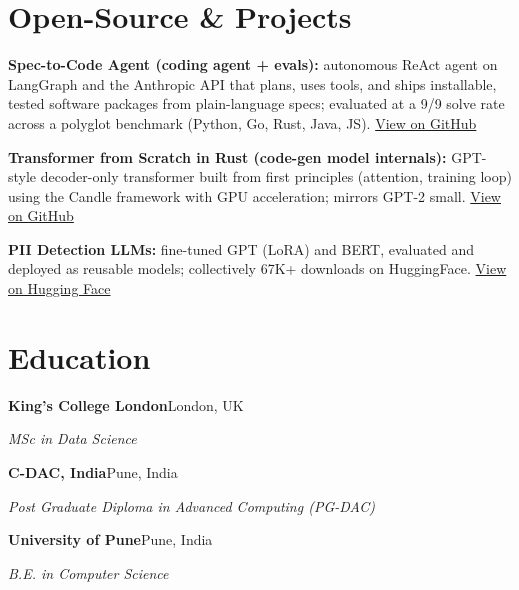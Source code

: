 \documentclass[10pt,letterpaper]{article}
\begin{document}
\section{Open-Source \& Projects}
\begin{tight}
  \item \textbf{Spec-to-Code Agent (coding agent + evals):} autonomous ReAct agent on LangGraph and the Anthropic API that plans, uses tools, and ships installable, tested software packages from plain-language specs; evaluated at a 9/9 solve rate across a polyglot benchmark (Python, Go, Rust, Java, JS). \href{https://github.com/abhijeetscode/Spec-to-Code-Agent}{View on GitHub}
  \item \textbf{Transformer from Scratch in Rust (code-gen model internals):} GPT-style decoder-only transformer built from first principles (attention, training loop) using the Candle framework with GPU acceleration; mirrors GPT-2 small. \href{https://github.com/abhijeetscode/transformer-rust}{View on GitHub}
  \item \textbf{PII Detection LLMs:} fine-tuned GPT (LoRA) and BERT, evaluated and deployed as reusable models; collectively 67K+ downloads on HuggingFace. \href{https://huggingface.co/ab-ai/pii_model}{View on Hugging Face}
\end{tight}

\section{Education}
{\color{company}\bfseries King's College London}\hfill {\color{muted}London, UK}\par
{\itshape MSc in Data Science}\par\vspace{2pt}
{\color{company}\bfseries C-DAC, India}\hfill {\color{muted}Pune, India}\par
{\itshape Post Graduate Diploma in Advanced Computing (PG-DAC)}\par\vspace{2pt}
{\color{company}\bfseries University of Pune}\hfill {\color{muted}Pune, India}\par
{\itshape B.E. in Computer Science}\par
\end{document}
